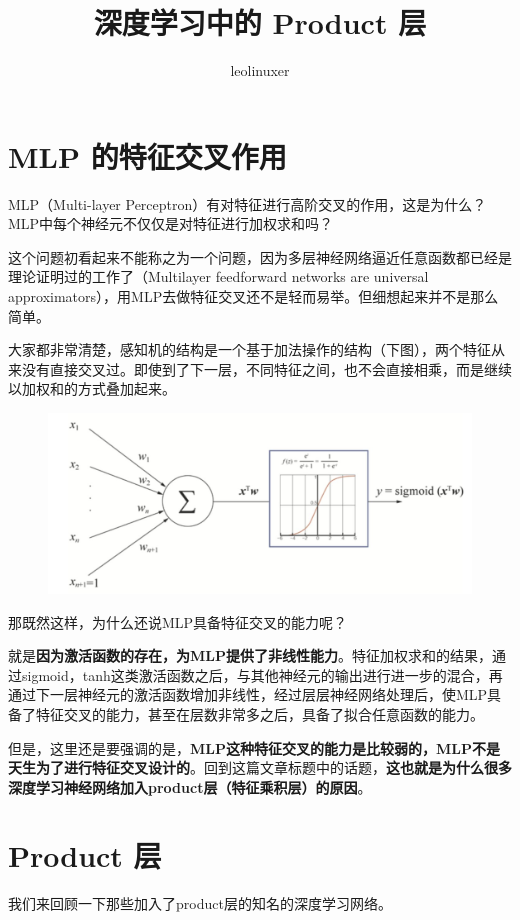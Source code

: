 \documentclass[12pt]{article}
\title{深度学习中的 Product 层\cite{Product_Layer_In_Deep_Learning}}
\author{leolinuxer}
\begin{document}
\maketitle
\tableofcontents

\section{MLP 的特征交叉作用}
MLP（Multi-layer Perceptron）有对特征进行高阶交叉的作用，这是为什么？MLP中每个神经元不仅仅是对特征进行加权求和吗？

这个问题初看起来不能称之为一个问题，因为多层神经网络逼近任意函数都已经是理论证明过的工作了（Multilayer feedforward networks are universal approximators），用MLP去做特征交叉还不是轻而易举。但细想起来并不是那么简单。

大家都非常清楚，感知机的结构是一个基于加法操作的结构（下图），两个特征从来没有直接交叉过。即使到了下一层，不同特征之间，也不会直接相乘，而是继续以加权和的方式叠加起来。
\begin{figure}[H]
    \centering
    \includegraphics[width=.6\textwidth]{fig/Perception_Layer_Structure.png}
\end{figure}

那既然这样，为什么还说MLP具备特征交叉的能力呢？

就是\textbf{因为激活函数的存在，为MLP提供了非线性能力}。特征加权求和的结果，通过sigmoid，tanh这类激活函数之后，与其他神经元的输出进行进一步的混合，再通过下一层神经元的激活函数增加非线性，经过层层神经网络处理后，使MLP具备了特征交叉的能力，甚至在层数非常多之后，具备了拟合任意函数的能力。

但是，这里还是要强调的是，\textbf{MLP这种特征交叉的能力是比较弱的，MLP不是天生为了进行特征交叉设计的}。回到这篇文章标题中的话题，\textbf{这也就是为什么很多深度学习神经网络加入product层（特征乘积层）的原因}。

\section{Product 层}
我们来回顾一下那些加入了product层的知名的深度学习网络。
\end{document}
